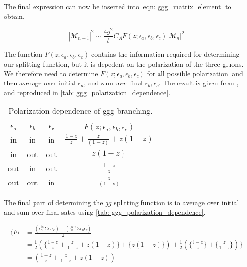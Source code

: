 \documentclass[main.tex]{subfiles}
\begin{document}
The final expression can now be inserted into \autoref{eqn: ggg_matrix_element} to obtain, 

\begin{equation}\label{eqn: ggg_matrix_element_ellis_5.9}
    |\mathcal{M}_{n+1}|^2 \sim \frac{4g^2}{t} C_A F(z;\epsilon_a,\epsilon_b,\epsilon_c) |\mathcal{M}_n|^2
\end{equation}

The function \(F(z;\epsilon_a,\epsilon_b,\epsilon_c)\) contains the information required for determining our splitting function, but it is depedent on the polarization of the three gluons. We therefore need to determine \(F(z;\epsilon_a,\epsilon_b,\epsilon_c)\) for all possible polarization, and then average over initial \(\epsilon_a\), and sum over final \(\epsilon_b, \epsilon_c\). The result is given from \cite{ellis_stirling_webber_1996}, and reproduced in \autoref{tab: ggg_polarization_dependence}.

\begin{table}[h]
    \centering
    \begin{tabular}[]{cccccc}
        \(\epsilon_a\) & \(\epsilon_b\) & \(\epsilon_c\)& \multicolumn{3}{c}{\(F(z;\epsilon_a,\epsilon_b,\epsilon_c)\)} \\
        \cmidrule(lr){1-3} \cmidrule(lr){4-6}
        in & in & in & \multicolumn{3}{c}{\(\frac{1-z}{z} + \frac{z}{(1-z)} + z(1-z)\)} \\[0.2cm]
        in & out & out & \multicolumn{3}{c}{\(z(1-z)\)} \\[0.2cm]
        out & in & out & \multicolumn{3}{c}{\(\frac{1-z}{z} \)} \\[0.2cm]
        out & out & in & \multicolumn{3}{c}{\(\frac{z}{(1-z)} \)} \\[0.2cm]
        \bottomrule
    \end{tabular}
    \caption{Polarization dependence of ggg-branching.}
    \label{tab: ggg_polarization_dependence}
\end{table}

The final part of determining the \(gg\) splitting function is to average over initial and sum over final sates using \autoref{tab: ggg_polarization_dependence}.

\begin{align}\label{eqn: ggg_polarizations_summed&averaged}
    \langle F \rangle &= \frac{(\epsilon_a^{\text{in}} \Sigma \epsilon_b\epsilon_c ) + (\epsilon_a^{\text{out}} \Sigma \epsilon_b\epsilon_c)}{2} \nonumber\\
    &= \frac{1}{2} \left( \{ \frac{1-z}{z} + \frac{z}{1-z} + z(1-z) \} + \{ z(1-z) \} \right) + \frac{1}{2} \left( \{\frac{1-z}{z} \} + \{ \frac{z}{1-z} \}\right) \} \nonumber\\
    &= \left( \frac{1-z}{z} + \frac{z}{1-z} + z(1-z) \right)
\end{align}
\end{document}

